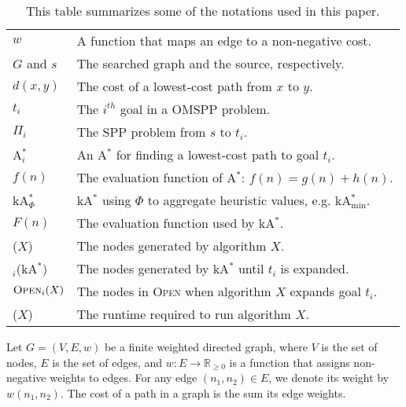 \documentclass[smallextended]{svjour3}       %
\newcommand{\omspp}{\ac{OMSPP}\xspace}
\newcommand{\spp}{\ac{SPP}\xspace}
\newcommand{\astar}{A$^*$\xspace}
\newcommand{\kastar}{kA$^*$\xspace}
\newcommand{\kastarvar}[1]{\textup{kA}$^*_{#1}$\xspace}
\newcommand{\kastarmin}{\kastarvar{\min}}
\newcommand{\kastarphi}{\textup{kA}$^*_{\Phi}$\xspace}
\newcommand{\astari}[1]{A$^*_{#1}$\xspace}
\newcommand{\Gen}{\text{Gen}}
\newcommand{\Exp}{\text{Exp}}
\newcommand{\Time}{\text{Time}}
\newcommand{\minf}{$F_{min}(n)$\xspace}
\newcommand{\open}{\textsc{Open}\xspace}
\newcommand{\nonnegreals}{\mathbb{R}_{\geq 0}}
\newcommand{\abda}[1]{\textbf{[AS:#1]}}
\begin{document}
\begin{table}
  \centering
  \footnotesize
  \begin{tabular}{|l|m{78mm}|}
    \hline
    $w$         & A function that maps an edge to a non-negative cost.  \\
    $G$ and $s$ & The searched graph and the source, respectively. \\
    $d(x, y)$   & The cost of a lowest-cost path from $x$ to $y$. \\
    $t_i$       & The $i^{th}$ goal in a \omspp problem. \\
    $\Pi_i$     & The \spp problem from $s$ to $t_i$. \\
    \astari{i}  & An \astar for finding a lowest-cost path to goal $t_i$. \\
    $f(n)$      & The evaluation function of \astar: $f(n)=g(n)+h(n)$. \\
    \kastarphi  & \kastar using $\Phi$ to aggregate heuristic values, e.g. \kastarmin.\\
    $F(n)$      & The evaluation function used by \kastar. \\
    \Gen($X$)    & The nodes generated by algorithm $X$. \\
    \Gen$_i$(\kastar) & The nodes generated by \kastar until $t_i$ is expanded. \\
    $\open_i(X)$ & The nodes in \open when algorithm $X$ expands goal $t_i$.\\
    \Time($X$)   & The runtime required to run algorithm $X$. \\
    \hline
  \end{tabular}
  \caption{This table summarizes some of the notations used in this paper.}
  \label{tab:notations}
\end{table}


Let $G = (V, E, w)$ be a finite weighted directed graph, where $V$ is the set of nodes, $E$ is the set of edges, and $w:E\rightarrow \nonnegreals$ is a function that assigns non-negative weights to edges. 
For any edge $(n_1,n_2)\in E$, we denote its weight by $w(n_1, n_2)$. The cost of a path in a graph is the sum its edge weights. %
\end{document}
